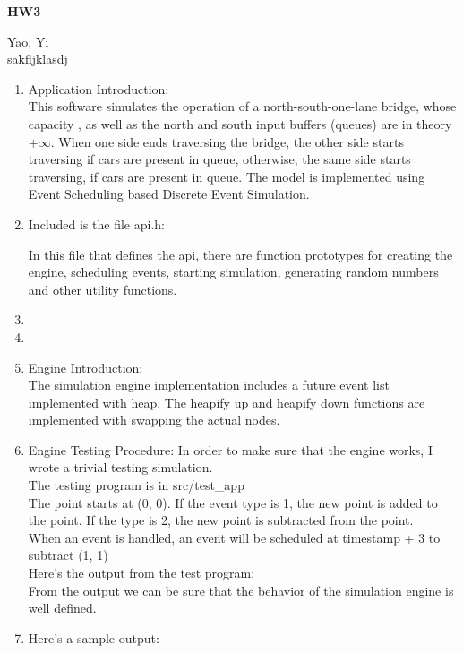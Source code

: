 \documentclass{article}
\begin{document}
	\begin{center}
		\begin{LARGE}
			\textbf{HW3}\\
		\end{LARGE}
		Yao, Yi\\
		sakfljklasdj
	\end{center}
	\begin{enumerate}
		\item 
		Application Introduction:\\
		This software simulates the operation of a north-south-one-lane bridge, whose capacity , as well as the north and south input buffers (queues) are in theory $+\infty$. When one side ends traversing the bridge, the other side starts traversing if cars are present in queue, otherwise, the same side starts traversing, if cars are present in queue. The model is implemented using Event Scheduling based Discrete Event Simulation.
		\item 
		Included is the file api.h:
		
		In this file that defines the api, there are function prototypes for creating the engine, scheduling events, starting simulation, generating random numbers and other utility functions.
		\item 
		\item 
		\item 
		Engine Introduction:\\
		The simulation engine implementation includes a future event list implemented with heap. The heapify up and heapify down functions are implemented with swapping the actual nodes.
		\item 
		Engine Testing Procedure:
		In order to make sure that the engine works, I wrote a trivial testing simulation.\\
		The testing program is in src/test\_app\\
		
		The point starts at (0, 0). If the event type is 1, the new point is added to the point. If the type is 2, the new point is subtracted from the point.\\
		When an event is handled, an event will be scheduled at timestamp + 3 to subtract (1, 1)\\
		Here's the output from the test program:\\
		
		From the output we can be sure that the behavior of the simulation engine is well defined.
		\item 
		Here's a sample output:\\

\end{enumerate}
\end{document}

